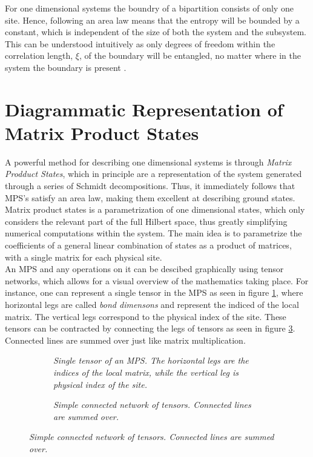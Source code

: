For one dimensional systems the boundry of a bipartition consists of only one site. Hence, following an area law means that the entropy will be bounded by a constant, which is independent of the size of both the system and the subsystem. This can be understood intuitively as only degrees of freedom within the correlation length, $\xi$, of the boundary will be entangled, no matter where in the system the boundary is present \cite{Hastings2007}.\\


\section{Diagrammatic Representation of Matrix Product States}
A powerful method for describing one dimensional systems is through \textit{Matrix Prodduct States}, which in principle are a representation of the system generated through a series of Schmidt decompositions. Thus, it immediately follows that MPS's satisfy an area law, making them excellent at describing ground states.\\ 


Matrix product states is a parametrization of one dimensional states, which only considers the relevant part of the full Hilbert space, thus greatly simplifying numerical computations within the system. The main idea is to parametrize the coefficients of a general linear combination of states as a product of matrices, with a single matrix for each physical site.\\
An MPS and any operations on it can be descibed graphically using tensor networks, which allows for a visual overview of the mathematics taking place. For instance, one can represent a single tensor in the MPS as seen in figure \ref{fig:singleTensor}, where horizontal legs are called \textit{bond dimensons} and represent the indiced of the local matrix. The vertical legs correspond to the physical index of the site. These tensors can be contracted by connecting the legs of tensors as seen in figure \ref{fig:simpleConnected}. Connected lines are summed over just like matrix multiplication. 

\begin{figure}[h!]
	\centering
	\begin{subfigure}{\linewidth}
		\centering
		
		\caption{\textit{Single tensor of an MPS. The horizontal legs are the indices of the local matrix, while the vertical leg is physical index of the site.}}
		\label{fig:singleTensor}
	\end{subfigure}
	\begin{subfigure}{\linewidth}
		\centering
		
		\caption{\textit{Simple connected network of tensors. Connected lines are summed over.}}
		\label{fig:simpleConnected}
	\end{subfigure}
	
\end{figure}


